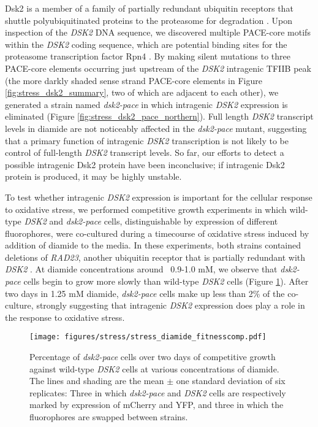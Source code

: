 Dsk2 is a member of a family of partially redundant ubiquitin receptors that shuttle polyubiquitinated proteins to the proteasome for degradation \citep{funakoshi2002}.
Upon inspection of the \textit{DSK2} DNA sequence, we discovered multiple PACE-core motifs within the \textit{DSK2} coding sequence, which are potential binding sites for the proteasome transcription factor Rpn4 \citep{shirozu2015}.
By making silent mutations to three PACE-core elements occurring just upstream of the \textit{DSK2} intragenic TFIIB peak (the more darkly shaded sense strand PACE-core elements in Figure \ref{fig:stress_dsk2_summary}, two of which are adjacent to each other), we generated a strain named \textit{dsk2-pace} in which intragenic \textit{DSK2} expression is eliminated (Figure \ref{fig:stress_dsk2_pace_northern}).
Full length \textit{DSK2} transcript levels in diamide are not noticeably affected in the \textit{dsk2-pace} mutant, suggesting that a primary function of intragenic \textit{DSK2} transcription is not likely to be control of full-length \textit{DSK2} transcript levels.
So far, our efforts to detect a possible intragenic Dsk2 protein have been inconclusive; if intragenic Dsk2 protein is produced, it may be highly unstable.

To test whether intragenic \textit{DSK2} expression is important for the cellular response to oxidative stress, we performed competitive growth experiments in which wild-type \textit{DSK2} and \textit{dsk2-pace} cells, distinguishable by expression of different fluorophores, were co-cultured during a timecourse of oxidative stress induced by addition of diamide to the media.
In these experiments, both strains contained deletions of \textit{RAD23}, another ubiquitin receptor that is partially redundant with \textit{DSK2} \citep{saeki2002, rao2002}.
At diamide concentrations around ~0.9-1.0 mM, we observe that \textit{dsk2-pace} cells begin to grow more slowly than wild-type \textit{DSK2} cells (Figure \ref{fig:stress_diamide_fitnesscomp}).
After two days in 1.25 mM diamide, \textit{dsk2-pace} cells make up less than 2\% of the co-culture, strongly suggesting that intragenic \textit{DSK2} expression does play a role in the response to oxidative stress.

\begin{figure}[h]
    \texttt{[image: figures/stress/stress\_diamide\_fitnesscomp.pdf]}
    \caption[Percentage of \textit{dsk2-pace} cells over two days of competitive growth against wild-type \textit{DSK2} cells at various concentrations of diamide.]{Percentage of \textit{dsk2-pace} cells over two days of competitive growth against wild-type \textit{DSK2} cells at various concentrations of diamide. The lines and shading are the mean $\pm$ one standard deviation of six replicates: Three in which \textit{dsk2-pace} and \textit{DSK2} cells are respectively marked by expression of mCherry and YFP, and three in which the fluorophores are swapped between strains.}
    \label{fig:stress_diamide_fitnesscomp}
\end{figure}

